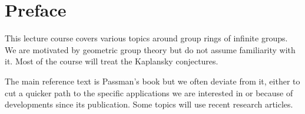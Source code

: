 \chapter*{Preface}

This lecture course covers various topics around group rings of infinite groups.
We are motivated by geometric group theory but do not assume familiarity with it.
Most of the course will treat the Kaplansky conjectures.

The main reference text is Passman's book \cite{Passman} but we often deviate from it, either to cut a quicker path to the specific applications we are interested in or because of developments since its publication.
Some topics will use recent research articles.
